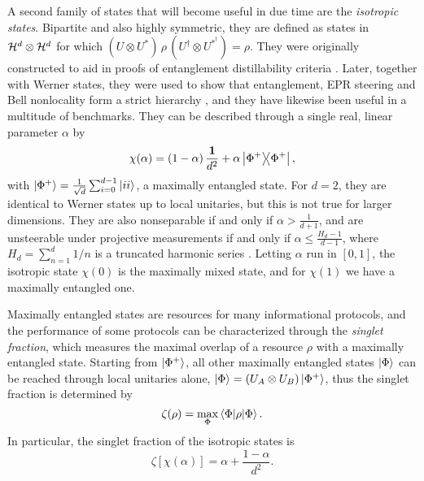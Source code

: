 		A second family of states that will become useful in due time are the \emph{isotropic states}. Bipartite and also highly symmetric, they are defined as states in $\mathcal{H}^{d} \otimes \mathcal{H}^{d}$ for which $(U \otimes U^*) \,\rho\, (U^\dagger \otimes U^{*^\dagger}) = \rho$. They were originally constructed to aid in proofs of entanglement distillability criteria \cite{horodecki_1999_isotropic}. Later, together with Werner states, they were used to show that entanglement, EPR steering and Bell nonlocality form a strict hierarchy \cite{wiseman_2007_steering,quintino_2015_inequivalence}, and they have likewise been useful in a multitude of benchmarks. They can be described through a single real, linear parameter $\alpha$ by
		\begin{equation}
			\chi(\alpha) = \left(1 - \alpha\right) \frac{\mathbf{1}}{d^2} + \alpha \ketbra{\Phi^+}{\Phi^+} ,
			\label{eq:isotropic-states}
		\end{equation}
		with $\ket{\Phi^+} = \frac{1}{\sqrt{d}} \sum_{i = 0}^{d - 1} \ket{ii}$, a maximally entangled state. For $d = 2$, they are identical to Werner states up to local unitaries, but this is not true for larger dimensions. They are also nonseparable if and only if $\alpha > \frac{1}{d+1}$, and are unsteerable under projective measurements if and only if $\alpha \leq \frac{H_d - 1}{d-1}$, where $H_d = \sum_{n=1}^d 1/n$ is a truncated harmonic series \cite{wiseman_2007_steering}. Letting $\alpha$ run in $[0,1]$, the isotropic state $\chi(0)$ is the maximally mixed state, and for $\chi(1)$ we have a maximally entangled one.
	
		Maximally entangled states are resources for many informational protocols, and the performance of some protocols can be characterized through the \emph{singlet fraction}, which measures the maximal overlap of a resource $\rho$ with a maximally entangled state. Starting from $\ket{\Phi^+}$, all other maximally entangled states $\ket{\Phi}$ can be reached through local unitaries alone, $\ket{\Phi} = (U_A \otimes U_B) \ket{\Phi^+}$, thus the singlet fraction is determined by
		$$
			\zeta(\rho) = \max_\Phi \left\langle \Phi \middle\vert \rho \middle\vert \Phi \right\rangle .
		$$
		In particular, the singlet fraction of the isotropic states is
		\begin{equation}
			\zeta\left[ \chi(\alpha) \right] = \alpha + \frac{1 - \alpha}{d^2} .
			\label{eq:singlet-fraction-isotropic-states}
		\end{equation}


